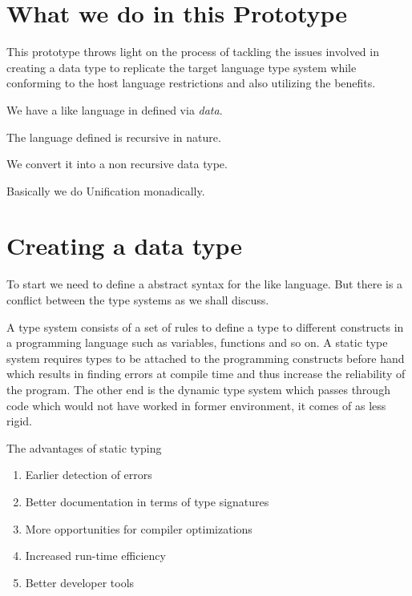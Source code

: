 \documentclass[thesis-solanki.tex]{subfiles}
\begin{document}
\section{What we do in this Prototype}\label{sec:proto1-what-we-do}
This prototype throws light on the process of tackling the issues involved in creating
a data type to replicate the target language type system while conforming to the host language restrictions and also utilizing the
benefits.


We have a  like language in  defined via \textit{data}.

The language defined is recursive in nature.

We convert it into a non recursive
data type.


Basically we do Unification
monadically.


\section{Creating a data type}

To start we need to define a abstract syntax for the  like language.
But there is a conflict between the type systems as we shall discuss.


A type system consists of a set of rules to define a type to different constructs in a
programming language such as variables, functions and so on.
A static type system requires types to be attached to the programming constructs before hand which results in
finding errors at compile time and thus increase the reliability of the program.
The other end is the dynamic type system which passes through code which would not have worked in former
environment, it comes of as less rigid.



The advantages of static typing \cite{meijer2004static}
\begin{enumerate}
\item Earlier detection of errors
\item Better documentation in terms of type signatures
\item More opportunities for compiler optimizations
\item Increased run-time efficiency
\item Better developer tools
\end{enumerate}
\end{document}
